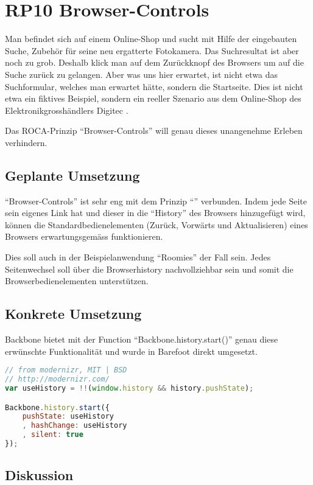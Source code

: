 \section{RP10 Browser-Controls}
\label{sec:principle-rp10-browser-controls}
Man befindet sich auf einem Online-Shop und sucht mit Hilfe der eingebauten Suche, Zubehör für seine neu ergatterte Fotokamera. Das Suchresultat ist aber noch zu grob. Deshalb klick man auf dem Zurückknopf des Browsers um auf die Suche zurück zu gelangen. Aber was uns hier erwartet, ist nicht etwa das Suchformular, welches man erwartet hätte, sondern die Startseite.
Dies ist nicht etwa ein fiktives Beispiel, sondern ein reeller Szenario aus dem Online-Shop des Elektronikgrosshändlers Digitec \cite{Digitec}.

Das ROCA-Prinzip ``Browser-Controls'' will genau dieses unangenehme Erleben verhindern.

\subsection*{Geplante Umsetzung}

``Browser-Controls'' ist sehr eng mit dem Prinzip ``'' verbunden. Indem jede Seite sein eigenes Link hat und dieser in die ``History'' des Browsers hinzugefügt wird, können die Standardbedienelementen (Zurück, Vorwärts und Aktualisieren) eines Browsers erwartungsgemäss funktionieren.

Dies soll auch in der Beispielanwendung ``Roomies'' der Fall sein. Jedes Seitenwechsel soll über die Browserhistory nachvollziehbar sein und somit die Browserbedienelementen unterstützen.

\subsection*{Konkrete Umsetzung}

Backbone bietet mit der Function ``Backbone.history.start()'' \cite{BackbonejsHistory} genau diese erwünschte Funktionalität und wurde in Barefoot direkt umgesetzt.

\begin{lstlisting}[language=JavaScript, caption=Activierung der History in Barefoot \cite{BarefootStartClient}, label=lst:barefootStartClientHistory, firstnumber=29]
// from modernizr, MIT | BSD
// http://modernizr.com/
var useHistory = !!(window.history && history.pushState);

Backbone.history.start({
	pushState: useHistory
	, hashChange: useHistory
	, silent: true
});
\end{lstlisting}

\subsection*{Diskussion}
